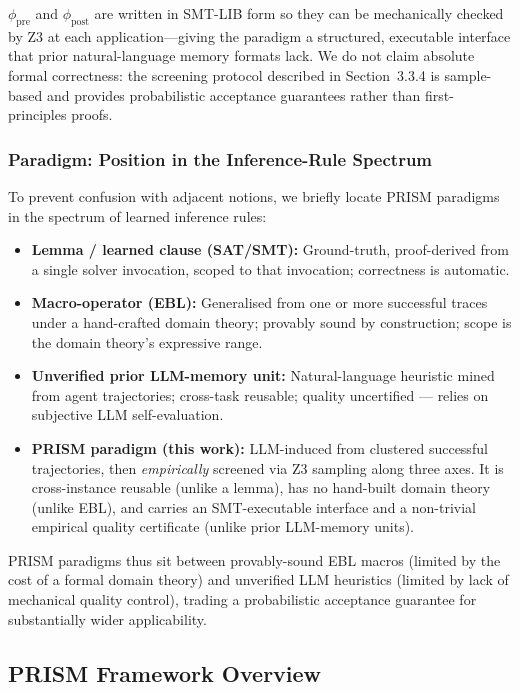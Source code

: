 $\phi_{\text{pre}}$ and $\phi_{\text{post}}$ are written in SMT-LIB form so they can be mechanically checked by Z3 at each application—giving the paradigm a structured, executable interface that prior natural-language memory formats lack. We do not claim absolute formal correctness: the screening protocol described in Section~3.3.4 is sample-based and provides probabilistic acceptance guarantees rather than first-principles proofs.

\subsubsection{Paradigm: Position in the Inference-Rule Spectrum}
\label{sec:paradigm-spectrum}

To prevent confusion with adjacent notions, we briefly locate PRISM paradigms in the spectrum of learned inference rules:

\begin{itemize}
    \item \textbf{Lemma / learned clause (SAT/SMT):} Ground-truth, proof-derived from a single solver invocation, scoped to that invocation; correctness is automatic.
    \item \textbf{Macro-operator (EBL):} Generalised from one or more successful traces under a hand-crafted domain theory; provably sound by construction; scope is the domain theory's expressive range.
    \item \textbf{Unverified prior LLM-memory unit:} Natural-language heuristic mined from agent trajectories; cross-task reusable; quality uncertified — relies on subjective LLM self-evaluation.
    \item \textbf{PRISM paradigm (this work):} LLM-induced from clustered successful trajectories, then \emph{empirically} screened via Z3 sampling along three axes. It is cross-instance reusable (unlike a lemma), has no hand-built domain theory (unlike EBL), and carries an SMT-executable interface and a non-trivial empirical quality certificate (unlike prior LLM-memory units).
\end{itemize}

PRISM paradigms thus sit between provably-sound EBL macros (limited by the cost of a formal domain theory) and unverified LLM heuristics (limited by lack of mechanical quality control), trading a probabilistic acceptance guarantee for substantially wider applicability.

\subsection{PRISM Framework Overview}

